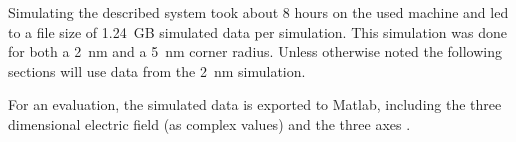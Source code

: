 Simulating the described system took about 8 hours on the used machine and led to a file size of \SI{1.24}{GB} simulated data per simulation. This simulation was done for both a \SI{2}{nm} and a \SI{5}{nm} corner radius. Unless otherwise noted the following sections will use data from the \SI{2}{nm} simulation.

For an evaluation, the simulated data is exported to Matlab, including the three dimensional electric field (as complex values) and the three axes .
